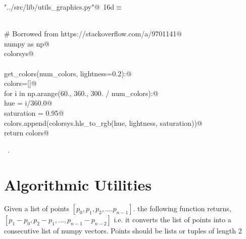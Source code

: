 \documentclass[11.5pt]{report}
\begin{document}
\begin{flushleft} \small\label{scrap11}\raggedright\small
{} \verb@"../src/lib/utils_graphics.py"@\nobreak\ {\footnotesize {16d}}$\equiv$
\vspace{-1ex}
\begin{list}{}{} \item
\mbox{}\verb@@\\
\mbox{}\verb@# Borrowed from https://stackoverflow.com/a/9701141@\\
\mbox{}\verb@import numpy as np@\\
\mbox{}\verb@import colorsys@\\
\mbox{}\verb@@\\
\mbox{}\verb@def get_colors(num_colors, lightness=0.2):@\\
\mbox{}\verb@    colors=[]@\\
\mbox{}\verb@    for i in np.arange(60., 360., 300. / num_colors):@\\
\mbox{}\verb@        hue        = i/360.0@\\
\mbox{}\verb@        saturation = 0.95@\\
\mbox{}\verb@        colors.append(colorsys.hls_to_rgb(hue, lightness, saturation))@\\
\mbox{}\verb@    return colors@\\
\mbox{}\verb@@{\NWsep}
\end{list}
\vspace{-1.5ex}
\footnotesize
\begin{list}{}{\setlength{\itemsep}{-\parsep}\setlength{\itemindent}{-\leftmargin}}
\item \NWtxtFileDefBy\ .

\item{}
\end{list}
\vspace{4ex}
\end{flushleft}


\section{Algorithmic Utilities}

\newchunk Given a list of  points $[p_0,p_1,p_2,....p_{n-1}]$. 
    the following function returns, $[p_1-p_0, p_2-p_1,...,p_{n-1}-p_{n-2}]$
    i.e. it converts the list of points into a consecutive list of numpy vectors. 
    Points should be lists or tuples of length 2
\end{document}
